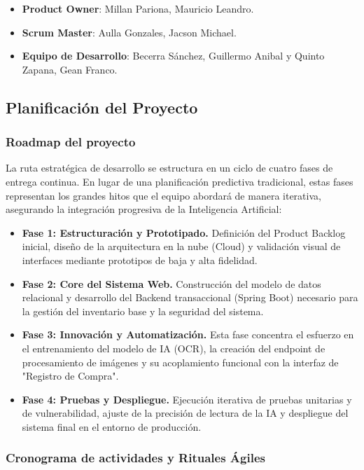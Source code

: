 \documentclass[12pt,a4paper]{article}
\begin{document}
\begin{itemize}
    \item \textbf{Product Owner}: Millan Pariona, Mauricio Leandro.
    \item \textbf{Scrum Master}: Aulla Gonzales, Jacson Michael.
    \item \textbf{Equipo de Desarrollo}: Becerra Sánchez, Guillermo Anibal y Quinto Zapana, Gean Franco.
\end{itemize}

\subsection{Planificación del Proyecto}
\subsubsection{Roadmap del proyecto}

La ruta estratégica de desarrollo se estructura en un ciclo de cuatro fases de entrega continua. En lugar de una planificación predictiva tradicional, estas fases representan los grandes hitos que el equipo abordará de manera iterativa, asegurando la integración progresiva de la Inteligencia Artificial:

\begin{itemize}
    \item \textbf{Fase 1: Estructuración y Prototipado.} Definición del Product Backlog inicial, diseño de la arquitectura en la nube (Cloud) y validación visual de interfaces mediante prototipos de baja y alta fidelidad.
    \item \textbf{Fase 2: Core del Sistema Web.} Construcción del modelo de datos relacional y desarrollo del Backend transaccional (Spring Boot) necesario para la gestión del inventario base y la seguridad del sistema.
    \item \textbf{Fase 3: Innovación y Automatización.} Esta fase concentra el esfuerzo en el entrenamiento del modelo de IA (OCR), la creación del endpoint de procesamiento de imágenes y su acoplamiento funcional con la interfaz de "Registro de Compra".
    \item \textbf{Fase 4: Pruebas y Despliegue.} Ejecución iterativa de pruebas unitarias y de vulnerabilidad, ajuste de la precisión de lectura de la IA y despliegue del sistema final en el entorno de producción.
\end{itemize}

\subsubsection{Cronograma de actividades y Rituales Ágiles}
\end{document}
